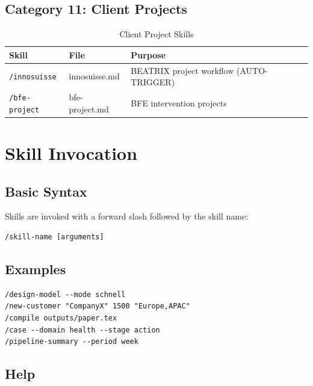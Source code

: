 \subsection{Category 11: Client Projects}

\begin{table}[htbp]
\centering
\begin{tabular}{|l|l|p{6cm}|}
\hline
\textbf{Skill} & \textbf{File} & \textbf{Purpose} \\
\hline
\texttt{/innosuisse} & innosuisse.md & BEATRIX project workflow (AUTO-TRIGGER) \\
\texttt{/bfe-project} & bfe-project.md & BFE intervention projects \\
\hline
\end{tabular}
\caption{Client Project Skills}
\end{table}


\section{Skill Invocation}
\label{sec:skills-invocation}

\subsection{Basic Syntax}

Skills are invoked with a forward slash followed by the skill name:

\begin{verbatim}
/skill-name [arguments]
\end{verbatim}

\subsection{Examples}

\begin{verbatim}
/design-model --mode schnell
/new-customer "CompanyX" 1500 "Europe,APAC"
/compile outputs/paper.tex
/case --domain health --stage action
/pipeline-summary --period week
\end{verbatim}

\subsection{Help}

